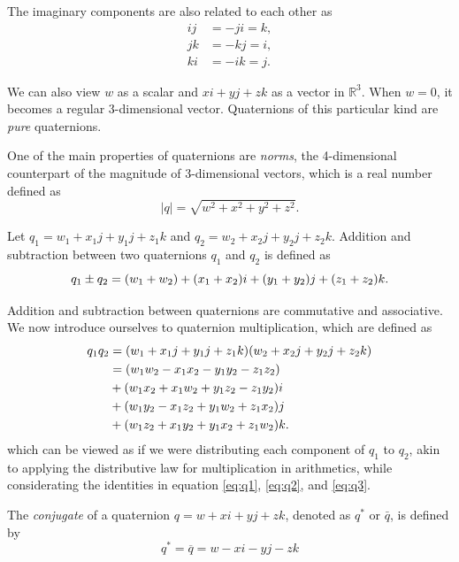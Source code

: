 \documentclass[conference]{IEEEtran}
\begin{document}
The imaginary components are also related to each other as
\begin{align} 
    ij &= -ji = k, \label{eq:q1}\\
    jk &= -kj = i, \label{eq:q2}\\
    ki &= -ik = j. \label{eq:q3}
\end{align}

We can also view $w$ as a scalar and $xi + yj + zk$ as a vector in $\mathbb{R}^3$. When $w = 0$, it becomes a regular 3-dimensional vector. Quaternions of this particular kind are \textit{pure} quaternions. 

One of the main properties of quaternions are \textit{norms}, the 4-dimensional counterpart of the magnitude of 3-dimensional vectors, which is a real number defined as
\begin{equation}
    |q| = \sqrt{w^2 + x^2 + y^2 + z^2}.
\end{equation}

Let $q_1 = w_1 + x_1j + y_1j + z_1k$ and $q_2 = w_2 + x_2j + y_2j + z_2k$. Addition and subtraction between two quaternions $q_1$ and $q_2$ is defined as
\begin{equation}
    \small
    {q_1} \pm {q_2} = (w_1 + w_2) + (x_1 + x_2)i + (y_1 + y_2)j + (z_1 + z_2)k.
\end{equation}

Addition and subtraction between quaternions are commutative and associative. We now introduce ourselves to quaternion multiplication, which are defined as
\begin{align}
    q_1 q_2 &= (w_1 + x_1j + y_1j + z_1k)(w_2 + x_2j + y_2j + z_2k) \notag \\
    &= (w_1w_2 - x_1x_2 - y_1y_2 - z_1z_2) \notag \\
    & + (w_1x_2 + x_1w_2 + y_1z_2 - z_1y_2)i \notag \\
    & + (w_1y_2 - x_1z_2 + y_1w_2 + z_1x_2)j \notag \\
    & + (w_1z_2 + x_1y_2 + y_1x_2 + z_1w_2)k.
\end{align}
which can be viewed as if we were distributing each component of $q_1$ to $q_2$, akin to applying the distributive law for multiplication in arithmetics, while considerating the identities in equation \ref{eq:q1}, \ref{eq:q2}, and \ref{eq:q3}.

The \textit{conjugate} of a quaternion $q = w + xi + yj + zk$, denoted as $q^*$ or $\bar{q}$, is defined by
\begin{equation}
    q^* = \overline{q} = w - xi - yj - zk
\end{equation}
\end{document}
